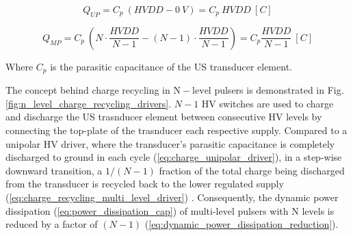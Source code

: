 \begin{equation}
    \label{eq:charge_unipolar_driver}
    Q_{UP} = C_p \ (HVDD - 0  \ V) = C_p \ HVDD \ [C]
\end{equation}

\begin{equation}
    \label{eq:charge_recycling_multi_level_driver}
    Q_{MP} = C_p \ \left( N \cdot \frac{HVDD}{N-1} - (N-1)\cdot \frac{HVDD}{N-1}\right) = C_p \frac{HVDD}{N-1} \ [C]
\end{equation}

Where $C_p$ is the parasitic capacitance of the US transducer element.
\\
\par 
The concept behind charge recycling in $\mathrm{N-level}$ pulsers is demonstrated in Fig. \ref{fig:n_level_charge_recycling_drivers}. $N-1$ HV switches are used to charge and discharge the US trasnducer element between consecutive HV levels by connecting the top-plate of the trasnducer each respective supply. Compared to a unipolar HV driver, where the transducer's parasitic capacitance is completely discharged to ground in each cycle (\ref{eq:charge_unipolar_driver}), in a step-wise downward transition, a $1/(N-1)$ fraction of the total charge being discharged from the transducer is recycled back to the lower regulated supply (\ref{eq:charge_recycling_multi_level_driver}) \cite{ChaoChenReviewPaperRef38}. 
Consequently, the dynamic power dissipation (\ref{eq:power_dissipation_cap}) of multi-level pulsers with N levels is reduced by a factor of $(N-1)$ (\ref{eq:dynamic_power_dissipation_reduction}). 

